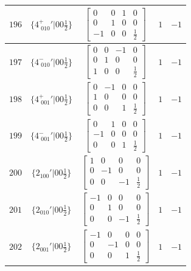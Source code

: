 \documentclass[fleqn,8pt]{jsarticle}
\begin{document}
\begin{longtable}{ccccc}
$ 196 $ & $ \{4^{+}_{\,\,010}{}'|0 0 \frac{1}{2}\} $ & $ \begin{bmatrix} 0 & 0 & 1 & 0 \\ 0 & 1 & 0 & 0 \\ -1 & 0 & 0 & \frac{1}{2} \end{bmatrix} $ & $ 1 $ & $ -1 $ \\ \hline
$ 197 $ & $ \{4^{-}_{\,\,010}{}'|0 0 \frac{1}{2}\} $ & $ \begin{bmatrix} 0 & 0 & -1 & 0 \\ 0 & 1 & 0 & 0 \\ 1 & 0 & 0 & \frac{1}{2} \end{bmatrix} $ & $ 1 $ & $ -1 $ \\ \hline
$ 198 $ & $ \{4^{+}_{\,\,001}{}'|0 0 \frac{1}{2}\} $ & $ \begin{bmatrix} 0 & -1 & 0 & 0 \\ 1 & 0 & 0 & 0 \\ 0 & 0 & 1 & \frac{1}{2} \end{bmatrix} $ & $ 1 $ & $ -1 $ \\ \hline
$ 199 $ & $ \{4^{-}_{\,\,001}{}'|0 0 \frac{1}{2}\} $ & $ \begin{bmatrix} 0 & 1 & 0 & 0 \\ -1 & 0 & 0 & 0 \\ 0 & 0 & 1 & \frac{1}{2} \end{bmatrix} $ & $ 1 $ & $ -1 $ \\ \hline
$ 200 $ & $ \{2{}_{100}{}'|0 0 \frac{1}{2}\} $ & $ \begin{bmatrix} 1 & 0 & 0 & 0 \\ 0 & -1 & 0 & 0 \\ 0 & 0 & -1 & \frac{1}{2} \end{bmatrix} $ & $ 1 $ & $ -1 $ \\ \hline
$ 201 $ & $ \{2{}_{010}{}'|0 0 \frac{1}{2}\} $ & $ \begin{bmatrix} -1 & 0 & 0 & 0 \\ 0 & 1 & 0 & 0 \\ 0 & 0 & -1 & \frac{1}{2} \end{bmatrix} $ & $ 1 $ & $ -1 $ \\ \hline
$ 202 $ & $ \{2{}_{001}{}'|0 0 \frac{1}{2}\} $ & $ \begin{bmatrix} -1 & 0 & 0 & 0 \\ 0 & -1 & 0 & 0 \\ 0 & 0 & 1 & \frac{1}{2} \end{bmatrix} $ & $ 1 $ & $ -1 $ \\ \hline

\end{longtable}
\end{document}
